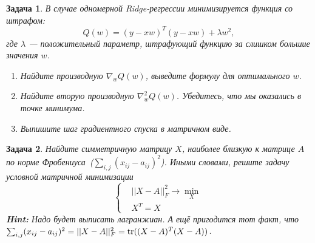 \documentclass[12pt,fleqn]{article}
\newtheorem{esProblem}{Задача}
\begin{document}
\begin{esProblem}
    В случае одномерной Ridge-регрессии минимизируется функция со штрафом:
    \[
    Q(w) = (y - xw)^T(y - xw) + \lambda w^2,
    \]
    где $\lambda$ — положительный параметр, штрафующий функцию за слишком большие значения $w$.
    
    \begin{enumerate}
        \item Найдите производную $\nabla_w Q(w)$, выведите формулу для оптимального $w$.
        \item Найдите вторую производную $\nabla_w^2 Q(w)$. Убедитесь, что мы оказались в точке минимума. 
        \item Выпишите шаг градиентного спуска в матричном виде.
    \end{enumerate}
\end{esProblem}

\begin{esProblem}
    Найдите симметричную матрицу $X$, наиболее близкую к матрице $A$ по норме Фробениуса~($\sum_{i,j} (x_{ij} - a_{ij})^2$).
    Иными словами, решите задачу условной матричной минимизации 
    \begin{equation*}
    \begin{cases}
    &||X - A||_F^2 \to \min_{X}  \\
    &X^T = X
    \end{cases}
    \end{equation*}
    \textbf{Hint:} Надо будет выписать лагранжиан.  А ещё пригодится тот факт, что $\sum_{i,j} (x_{ij} - a_{ij})^2 = ||X - A||_F^2 =  \mathop{\mathrm{tr}}((X-A)^T (X-A))$.
\end{esProblem}
\end{document}
